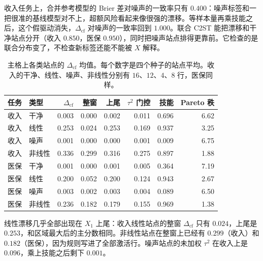 \documentclass[11pt,a4paper,fontset=none]{ctexart}
\newcommand{\Dcf}{\ensuremath{\Delta_{\mathrm{cf}}}}
\begin{document}
收入任务上，合并参考模型的 Brier 差对噪声的一致率只有 \(0.400\)：噪声标签和一把很准的基线模型对不上，超额风险看起来像很强的漂移。等样本量再乘技能之后，这个假驱动消失，\(\Dcf\) 对噪声的一致率回到 \(1.000\)。联合 C2ST 能把漂移和干净站点分开（收入 \(0.850\)，医保 \(0.950\)），同时把噪声站点排得更靠前。它检查的是联合分布变了，不检查新标签还能不能被 \(X\) 解释。

\begin{table}[ht]
\centering
\caption{主格上各类站点的 \(\Dcf\) 均值。每个数字是四个种子的站点平均。收入的干净、线性、噪声、非线性分别有 \(16\)、\(12\)、\(4\)、\(8\) 行，医保同样。}
\label{tab:site-means}
\small
\begin{tabular}{@{}llrrrrrr@{}}
\toprule
任务 & 类型 & \(\Dcf\) & 整窗 & 上尾 & \(\tau^{2}\) 门控 & 技能 & Pareto 秩 \\
\midrule
收入 & 干净 & 0.003 & 0.000 & 0.002 & 0.011 & 0.696 & 6.62 \\
收入 & 线性 & 0.253 & 0.024 & 0.253 & 0.169 & 0.937 & 3.25 \\
收入 & 噪声 & 0.001 & 0.000 & 0.000 & 0.001 & 0.009 & 6.75 \\
收入 & 非线性 & 0.336 & 0.299 & 0.316 & 0.275 & 0.897 & 1.88 \\
医保 & 干净 & 0.001 & 0.000 & 0.001 & 0.005 & 0.364 & 7.19 \\
医保 & 线性 & 0.200 & 0.052 & 0.200 & 0.124 & 0.943 & 2.67 \\
医保 & 噪声 & 0.003 & 0.002 & 0.003 & 0.004 & 0.089 & 6.50 \\
医保 & 非线性 & 0.236 & 0.182 & 0.179 & 0.155 & 0.969 & 1.38 \\
\bottomrule
\end{tabular}
\end{table}

线性漂移几乎全部出现在 \(X_1\) 上尾：收入线性站点的整窗 \(\Dcf\) 只有 \(0.024\)，上尾是 \(0.253\)，和区域最大后的主分数相同。非线性站点在整窗上已经有 \(0.299\)（收入）和 \(0.182\)（医保），因为规则写进了全部激活行。噪声站点的未加权 \(\tau^{2}\) 在收入上是 \(0.096\)，乘上技能之后剩下 \(0.001\)。
\end{document}
